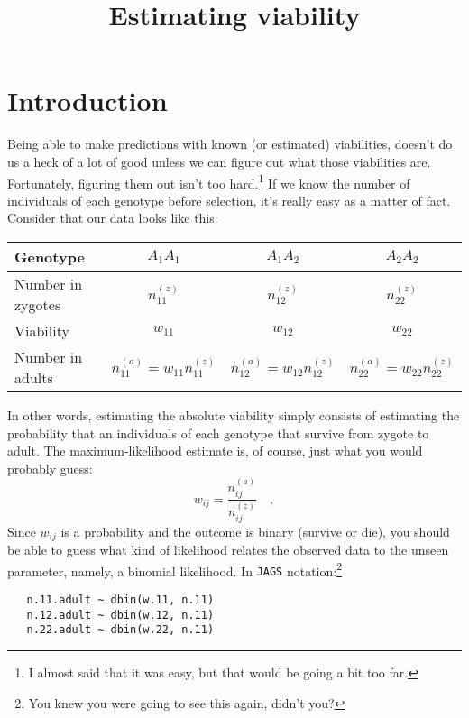 \documentclass[12pt]{article}
\title{Estimating viability}
\begin{document}
\maketitle

\thispagestyle{first}

\section*{Introduction}

Being able to make predictions with known (or estimated) viabilities,
doesn't do us a heck of a lot of good unless we can figure out what
those viabilities are. Fortunately, figuring them out isn't too
hard.\footnote{I almost said that it was easy, but that would be going
  a bit too far.} If we know the number of individuals of each
genotype before selection, it's really easy as a matter of
fact. Consider that our data looks like this:

\begin{center}
\begin{tabular}{l|ccc}
\hline\hline
Genotype & $A_1A_1$ & $A_1A_2$ & $A_2A_2$ \\
\hline
Number in zygotes & $n_{11}^{(z)}$ & $n_{12}^{(z)}$ & $n_{22}^{(z)}$ \\
Viability         & $w_{11}$ & $w_{12}$ & $w_{22}$ \\
Number in adults  & $n_{11}^{(a)} = w_{11}n_{11}^{(z)}$ & $n_{12}^{(a)} = w_{12}n_{12}^{(z)}$ & $n_{22}^{(a)} = w_{22}n_{22}^{(z)}$ \\
\hline
\end{tabular}
\end{center}

In other words, estimating the absolute viability simply consists of
estimating the probability that an individuals of each genotype that
survive from zygote to adult. The maximum-likelihood estimate is, of
course, just what you would probably guess:
\[
w_{ij} = \frac{n_{ij}^{(a)}}{n_{ij}^{(z)}} \quad ,
\]
Since $w_{ij}$ is a probability and the outcome is binary (survive or
die), you should be able to guess what kind of likelihood relates the
observed data to the unseen parameter, namely, a binomial
likelihood. In {\tt JAGS} notation:\footnote{You knew you were going
  to see this again, didn't you?}
\begin{verbatim}
   n.11.adult ~ dbin(w.11, n.11)
   n.12.adult ~ dbin(w.12, n.11)
   n.22.adult ~ dbin(w.22, n.11)
\end{verbatim}
\end{document}
